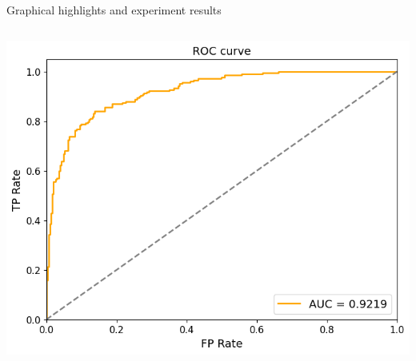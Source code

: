 \documentclass[]{beamer}
\begin{document}
\begin{frame}{Graphical highlights and experiment results}
\begin{columns}
\begin{column}{0.55\textwidth}
\begin{table}
{            }
        \end{table}
        \includegraphics[width=1\textwidth]{roc-curve.png}
    \end{column}
\end{columns}
\bigskip
\end{frame}
\end{document}
